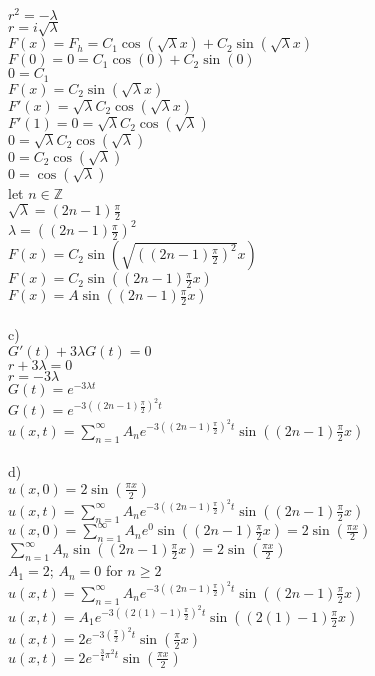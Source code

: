 \documentclass{article}
\begin{document}
\begin{enumerate}
\\$r^2=-\lambda$
\\$r=i\sqrt{\lambda}$
\\$F(x)=F_h=C_1\cos(\sqrt{\lambda}x)+C_2\sin(\sqrt{\lambda}x)$
\\$F(0)=0=C_1\cos(0)+C_2\sin(0)$
\\$0=C_1$
\\$F(x)=C_2\sin(\sqrt{\lambda}x)$
\\$F'(x)=\sqrt{\lambda}C_2\cos(\sqrt{\lambda}x)$
\\$F'(1)=0=\sqrt{\lambda}C_2\cos(\sqrt{\lambda})$
\\$0=\sqrt{\lambda}C_2\cos(\sqrt{\lambda})$
\\$0=C_2\cos(\sqrt{\lambda})$
\\$0=\cos(\sqrt{\lambda})$
\\let $n\in\mathbb{Z}$
\\$\sqrt{\lambda}=(2n-1)\frac{\pi}{2}$
\\$\lambda=((2n-1)\frac{\pi}{2})^2$
\\$F(x)=C_2\sin(\sqrt{((2n-1)\frac{\pi}{2})^2}x)$
\\$F(x)=C_2\sin((2n-1)\frac{\pi}{2}x)$
\\$F(x)=A\sin((2n-1)\frac{\pi}{2}x)$
\\
\\c)
\\$G'(t)+3\lambda G(t)=0$
\\$r+3\lambda=0$
\\$r=-3\lambda$
\\$G(t)=e^{-3\lambda t}$
\\$G(t)=e^{-3((2n-1)\frac{\pi}{2})^2 t}$
\\$u(x,t)=\sum_{n=1}^{\infty}A_ne^{-3((2n-1)\frac{\pi}{2})^2 t}\sin((2n-1)\frac{\pi}{2}x)$
\\
\\d)
\\$u(x,0)=2\sin(\frac{\pi x}{2})$
\\$u(x,t)=\sum_{n=1}^{\infty}A_ne^{-3((2n-1)\frac{\pi}{2})^2 t}\sin((2n-1)\frac{\pi}{2}x)$
\\$u(x,0)=\sum_{n=1}^{\infty}A_ne^{0}\sin((2n-1)\frac{\pi}{2}x)=2\sin(\frac{\pi x}{2})$
\\$\sum_{n=1}^{\infty}A_n\sin((2n-1)\frac{\pi}{2}x)=2\sin(\frac{\pi x}{2})$
\\$A_1=2$; $A_n=0$ for $n\ge2$
\\$u(x,t)=\sum_{n=1}^{\infty}A_ne^{-3((2n-1)\frac{\pi}{2})^2 t}\sin((2n-1)\frac{\pi}{2}x)$
\\$u(x,t)=A_1e^{-3((2(1)-1)\frac{\pi}{2})^2 t}\sin((2(1)-1)\frac{\pi}{2}x)$
\\$u(x,t)=2e^{-3(\frac{\pi}{2})^2 t}\sin(\frac{\pi}{2}x)$
\\$u(x,t)=2e^{-\frac{3}{4}\pi^2 t}\sin(\frac{\pi x}{2})$

\end{enumerate}
\end{document}
